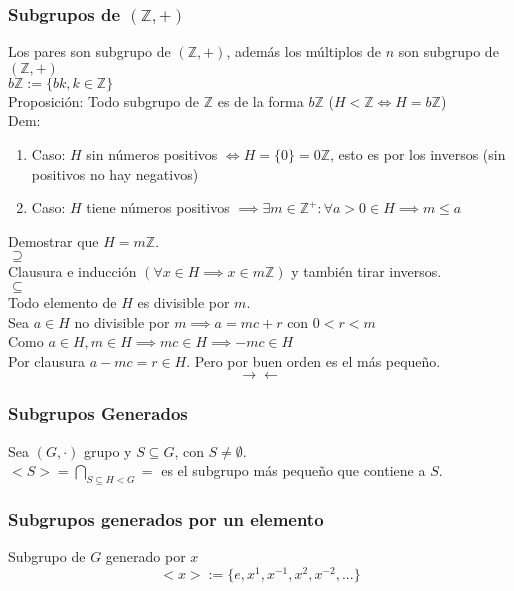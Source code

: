 \documentclass[11pt]{book}
\theoremstyle{definition}
\begin{document}
\subsubsection{Subgrupos de $(\mathbb{Z},+)$}
Los pares son subgrupo de $(\mathbb{Z},+)$, además los múltiplos de $n$ son subgrupo de $(\mathbb{Z},+)$\\
$b\mathbb{Z}:=\{bk,k\in\mathbb{Z}\}$\\
Proposición: Todo subgrupo de $\mathbb{Z}$ es de la forma $b\mathbb{Z}$ ($H<\mathbb{Z}\iff H=b\mathbb{Z}$)\\
Dem:\\
\begin{enumerate}
	\item Caso: $H$ sin números positivos $\iff H=\{0\}=0\mathbb{Z}$, esto es por los inversos (sin positivos no hay negativos)
	
	\item Caso: $H$ tiene números positivos $\implies\exists m\in\mathbb{Z}^+:\forall a>0\in H\implies m\leq a$
\end{enumerate}
Demostrar que $H=m\mathbb{Z}$.\\
$\supseteq$\\
Clausura e inducción $(\forall x\in H\implies x\in m\mathbb{Z})$ y también tirar inversos.\\
$\subseteq$\\
Todo elemento de $H$ es divisible por $m$.\\
Sea $a\in H$ no divisible por $m\implies a=mc+r$ con $0<r<m$\\
Como $a\in H,m\in H\implies mc\in H\implies -mc\in H$\\
Por clausura $a-mc=r\in H$. Pero por buen orden es el más pequeño.\\
\[
\rightarrow\leftarrow
\]
\subsubsection{Subgrupos Generados}

Sea $(G,\cdot)$ grupo y $S\subseteq G$, con $S\neq\emptyset$.\\
$<S>=\bigcap _{S\subseteq H<G}=$ es el subgrupo más pequeño que contiene a $S$.\\

\subsubsection{Subgrupos generados por un elemento}
Subgrupo de $G$ generado por $x$
\[
<x>:=\{e,x^1,x^{-1},x^2,x^{-2},...\}
\]
\end{document}
